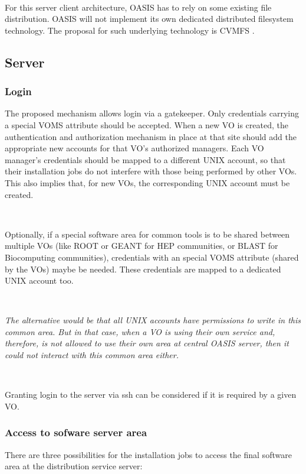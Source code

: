 \documentclass{article}
\begin{document}
~

For this server client architecture, OASIS has to rely on some existing file distribution.
OASIS will not implement its own dedicated distributed filesystem technology. 
The proposal for such underlying technology is CVMFS \cite{cvmfs}.

\subsection{Server}

\subsubsection{Login}

The proposed mechanism allows login via a gatekeeper.
Only credentials carrying a special VOMS attribute should be accepted. 
When a new VO is created, the authentication and authorization mechanism 
in place at that site should add the appropriate new accounts for that VO's authorized managers. 
Each VO manager's credentials should be mapped to a different UNIX account, 
so that their installation jobs do not interfere with those being performed by other VOs.
This also implies that, for new VOs, the corresponding UNIX account must be created.

~

Optionally, if a special software area for common tools is to be shared between multiple VOs 
(like ROOT or GEANT for HEP communities, or BLAST for Biocomputing communities), 
credentials with an special VOMS attribute (shared by the VOs) maybe be needed.
These credentials are mapped to a dedicated UNIX account too. 

~

\textit{The alternative would be that all UNIX accounts have permissions to write in this common area. 
But in that case, when a VO is using their own service and, therefore, 
is not allowed to use their own area at central OASIS server, 
then it could not interact with this common area either.}

~

Granting login to the server via ssh can be considered if it is required by a given VO. 


\subsubsection{Access to sofware server area}

There are three possibilities for the installation jobs to access the final software area
at the distribution service server:
\end{document}
